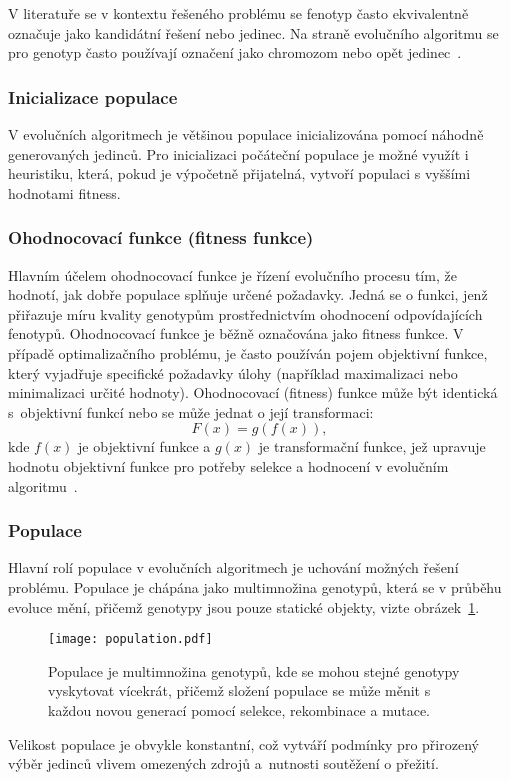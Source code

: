 V literatuře se v kontextu řešeného problému se fenotyp často ekvivalentně označuje jako kandidátní řešení nebo jedinec. 
Na straně evolučního algoritmu se pro genotyp často používají označení jako chromozom nebo opět jedinec~\cite{IntroductionToEvoComputing}.

\subsubsection*{Inicializace populace}
V evolučních algoritmech je většinou populace inicializována pomocí náhodně generovaných jedinců. 
Pro inicializaci počáteční populace je možné využít i heuristiku, která, pokud je výpočetně přijatelná, vytvoří populaci s vyššími hodnotami fitness. 

\subsubsection*{Ohodnocovací funkce (fitness funkce)}
Hlavním účelem ohodnocovací funkce je řízení evolučního procesu tím, že hodnotí, jak dobře populace splňuje určené požadavky. 
Jedná se o funkci, jenž přiřazuje míru kvality genotypům prostřednictvím ohodnocení odpovídajících fenotypů. 
Ohodnocovací funkce je běžně označována jako fitness funkce. 
V případě optimalizačního problému, je často používán pojem objektivní funkce, který vyjadřuje specifické požadavky úlohy (například maximalizaci nebo minimalizaci určité hodnoty).
Ohodnocovací (fitness) funkce může být identická s~objektivní funkcí nebo se může jednat o její transformaci:
\begin{equation*}
    F\left( x \right) = g\left( f \left( x \right)\right),
\end{equation*}
kde $f(x)$ je objektivní funkce a $g(x)$ je transformační funkce, jež upravuje hodnotu objektivní funkce pro potřeby selekce a hodnocení v evolučním algoritmu~\cite{IntroductionToEvoComputing,NaturalComputing}. 

\subsubsection*{Populace}
Hlavní rolí populace v evolučních algoritmech je uchování možných řešení problému. 
Populace je chápána jako multimnožina genotypů, která se v průběhu evoluce mění, přičemž genotypy jsou pouze statické objekty, vizte obrázek~\ref{fig:population}. 
\begin{figure}[ht!]
    \centering
    \texttt{[image: population.pdf]}
    \caption{Populace je multimnožina genotypů, kde se mohou stejné genotypy vyskytovat vícekrát, přičemž složení populace se může měnit s každou novou generací pomocí selekce, rekombinace a mutace.}
    \label{fig:population}
\end{figure}
Velikost populace je obvykle konstantní, což vytváří podmínky pro přirozený výběr jedinců vlivem omezených zdrojů a~nutnosti soutěžení o přežití.

